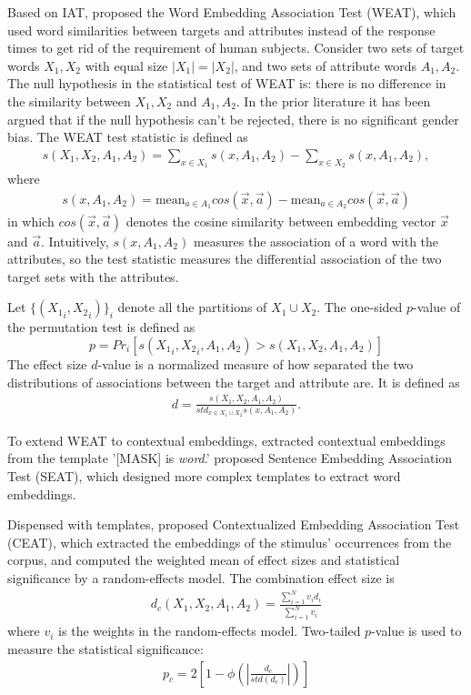 Based on IAT, \cite{caliskan2017semantics} proposed the Word Embedding Association Test (WEAT), which used word similarities between targets and attributes instead of the response times to get rid of the requirement of human subjects. Consider two sets of target words $X_1,X_2$ with equal size $|X_1|=|X_2|$, and two sets of attribute words $A_1,A_2$. The null hypothesis in the statistical test of WEAT is: there is no difference in the similarity between $X_1,X_2$ and $A_1,A_2$. In the prior literature it has been argued that if the null hypothesis can't be rejected, there is no significant gender bias. 
The WEAT test statistic is defined as
\begin{eqnarray}
s(X_1,X_2,A_1,A_2)=\sum_{x\in X_1}s(x,A_1,A_2)-\sum_{x\in X_2}s(x,A_1,A_2),\nonumber
\end{eqnarray}
where
\begin{eqnarray}
s(x,A_1,A_2)=\mbox{mean}_{a\in A_1}cos(\vec{x},\vec{a})-\mbox{mean}_{a\in A_2}cos(\vec{x},\vec{a})\nonumber
\end{eqnarray}
in which $cos(\vec{x},\vec{a})$ denotes the cosine similarity between embedding vector $\vec{x}$ and $\vec{a}$. Intuitively, $s(x,A_1,A_2)$ measures the association of a word with the attributes, so the test statistic measures the differential association of the two target sets with the attributes. 

Let $\{({X_1}_i,{X_2}_i)\}_{i}$ denote all the partitions of $X_1\cup X_2$. The one-sided $p$-value of the permutation test is defined as $$p=Pr_i[s({X_1}_i,{X_2}_i,A_1,A_2)>s(X_1,X_2,A_1,A_2)]$$
The effect size $d$-value is a normalized measure of how separated the two distributions of associations between the target and attribute are. It is defined as
\begin{eqnarray}
d=\frac{s(X_1,X_2,A_1,A_2)}{std_{x\in X_1 \cup X_2}s(x,A_1,A_2)}.\nonumber
\end{eqnarray}

To extend WEAT to contextual embeddings, \cite{karve2019conceptor} extracted contextual embeddings from the template '[MASK] is \textit{word}.' \cite{may2019measuring} proposed Sentence Embedding Association Test (SEAT), which designed more complex templates to extract word embeddings. 

Dispensed with templates, \cite{guo2020detecting} proposed Contextualized Embedding Association Test (CEAT), which extracted the embeddings of the stimulus' occurrences from the corpus, and computed the weighted mean of effect sizes and statistical significance by a random-effects model. The combination effect size is
\begin{eqnarray}
d_c(X_1,X_2,A_1,A_2)=\frac{\sum_{i=1}^{N}v_id_i}{\sum_{i=1}^{N}v_i}\nonumber
\end{eqnarray} 
where $v_i$ is the weights in the random-effects model. Two-tailed $p$-value is used to measure the statistical significance:
\begin{eqnarray}
	p_c = 2[1-\phi(|\frac{d_c}{std(d_c)}|)]\nonumber
\end{eqnarray}

